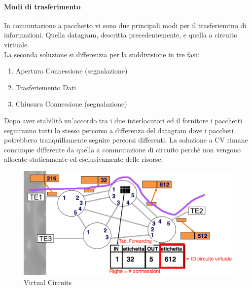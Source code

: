\documentclass[12pt]{article}
\begin{document}
\paragraph{Modi di trasferimento}
In commutazione a pacchetto vi sono due principali modi per il trasferiemtno di informazioni. Quella datagram, descritta precedentemente, e quella a circuito virtuale.\\
La seconda soluzione si differenzia per la suddivisione in tre fasi:
\begin{enumerate}
  \item Apertura Connessione (segnalazione)
  \item Trasferiemento Dati
  \item Chiusura Connessione (segnalazione)
\end{enumerate}
Dopo aver stabilitò un'accordo tra i due interlocutori ed il fornitore i pacchetti seguiranno tutti lo stesso percorso a differenza del datagram dove i paccheti potrebbero tranquillamente seguire percorsi differenti. La soluzione a CV rimane comunque differente da quella a commutazione di circuito perchè non vengono allocate staticamente ed esclusivamente delle risorse.\\
\begin{figure}[h!]
  \includegraphics[width=\linewidth]{images/vc.png}
  \caption{Virtual Circuits}
  \label{fig:vc}
\end{figure}



\end{document}
